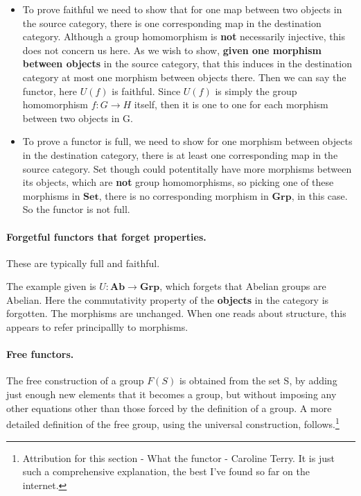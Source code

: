 \documentclass{article}
\begin{document}
\begin{itemize}
\item To prove faithful we need to show that for one map between two objects in the source category, there is one corresponding map in the destination category. Although a group homomorphism is \textbf{not} necessarily injective, this does not concern us here. As we wish to show, \textbf{given one morphism between objects} in the source category, that this induces in the destination category at most one morphism between objects there. Then we can say the functor, here $U(f)$ is faithful. Since $U(f)$ is simply the group homomorphism $f\colon G \rightarrow H$ itself, then it is one to one for each morphism between two objects in G.

\item To prove a functor is full, we need to show for one morphism between objects in the destination category, there is at least one corresponding map in the source category. Set though could potentitally have more morphisms between its objects, which are \textbf{not} group homomorphisms, so picking one of these morphisms in $\textbf{Set}$, there is no corresponding morphism in $\textbf{Grp}$, in this case. So the functor is not full.
\end{itemize}

\paragraph{Forgetful functors that forget properties.}

These are typically full and faithful.

The example given is $U:\textbf{Ab} \rightarrow \textbf{Grp}$, which forgets that Abelian groups are Abelian. Here the commutativity property of the \textbf{objects} in the category is forgotten. The morphisms are unchanged. When one reads about structure, this appears to refer principallly to morphisms.

\paragraph{Free functors.}

The free construction of a group $F(S)$ is obtained from the set S, by adding just enough new elements that it becomes a group, but without imposing any other equations other than those forced by the definition of a group. A more detailed definition of the free group, using the universal construction, follows.\footnote{Attribution for this section - What the functor - Caroline Terry. It is just such a comprehensive explanation, the best I've found so far on the internet.}
\end{document}
